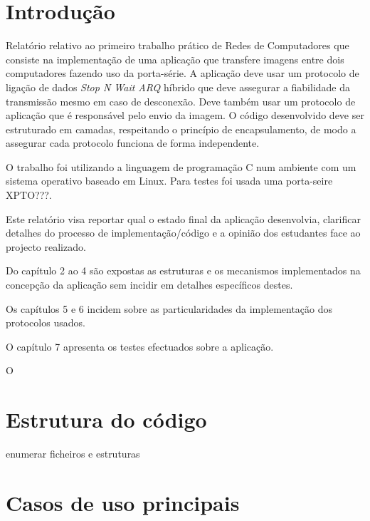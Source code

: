 \documentclass[11pt,a4paper,reqno]{report}
\numberwithin{equation}{section}
\begin{document}


\begin{abstract}

\end{abstract}

\tableofcontents

\chapter{Introdução}

	Relatório relativo ao primeiro trabalho prático de Redes de Computadores que consiste na implementação de uma aplicação que transfere imagens entre dois computadores fazendo uso da porta-série. A aplicação deve usar um protocolo de ligação de dados {\it Stop N Wait ARQ}  híbrido que deve assegurar a fiabilidade  da transmissão mesmo em caso de desconexão. Deve também usar um protocolo de aplicação que é responsável pelo envio da imagem. O código desenvolvido deve ser estruturado em camadas, respeitando o princípio de encapsulamento, de modo a assegurar cada protocolo funciona de forma independente.
	
	O trabalho foi utilizando a linguagem de programação C num ambiente com um sistema operativo baseado em Linux. Para testes foi usada uma porta-seire XPTO???.
	
	Este relatório visa reportar qual o estado final da aplicação desenvolvia, clarificar detalhes do processo de implementação/código e a opinião dos estudantes face ao projecto realizado.
	
	Do capítulo 2 ao 4 são expostas as estruturas e os mecanismos implementados na concepção da aplicação sem incidir em detalhes específicos destes.
	
	Os capítulos 5 e 6 incidem sobre as particularidades da implementação dos protocolos usados.
	
	O capítulo 7 apresenta os testes efectuados sobre a aplicação.
	
	O 

\chapter{Estrutura do código}

enumerar ficheiros e estruturas

\chapter{Casos de uso principais}
\end{document}
